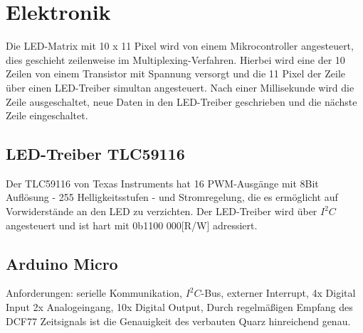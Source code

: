 
\section{Elektronik}
\label{sec:Elektronik}
Die LED-Matrix mit 10 x 11 Pixel wird von einem Mikrocontroller angesteuert, dies geschieht zeilenweise im Multiplexing-Verfahren. Hierbei wird eine der 10  Zeilen von einem Transistor mit Spannung versorgt und die 11 Pixel der Zeile über einen LED-Treiber simultan angesteuert. Nach einer Millisekunde wird die Zeile ausgeschaltet, neue Daten in den LED-Treiber geschrieben und die nächste Zeile eingeschaltet. 
\subsection{LED-Treiber TLC59116}
Der TLC59116 von Texas Instruments hat 16 PWM-Ausgänge mit 8Bit Auflösung - 255 Helligkeitsstufen - und Stromregelung, die es ermöglicht auf Vorwiderstände an den LED zu verzichten. Der LED-Treiber wird über $I^{2}C$ angesteuert und ist hart mit 0b1100 000[R/W] adressiert. 


\subsection{Arduino Micro}
Anforderungen: serielle Kommunikation, $I^{2}C$-Bus, externer Interrupt, 4x Digital Input 2x Analogeingang, 10x Digital Output, 
Durch regelmäßigen Empfang des DCF77 Zeitsignals ist die Genauigkeit des verbauten Quarz hinreichend genau.